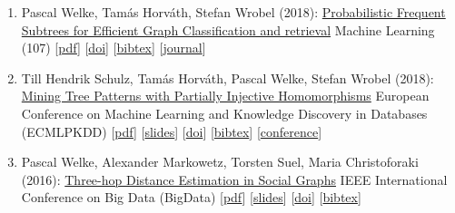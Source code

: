 \documentclass{scrartcl}
\begin{document}
\begin{enumerate}
Machine Learning (108)\newline
{\footnotesize
[\href{https://pwelke.de/publications/welke2019mach.pdf}{pdf}]
[\href{https://dx.doi.org/10.1007/s10994-019-05779-1}{doi}]
[\href{https://dblp.org/rec/journals/ml/WelkeHW19.bib}{bibtex}]
[\href{https://link.springer.com/journal/10994}{journal}]
}
\item
\label{welke2018mach}
Pascal Welke, Tamás Horváth, Stefan Wrobel (2018):\newline
\href{https://dx.doi.org/10.1007/s10994-017-5688-7}{Probabilistic Frequent Subtrees for Efficient Graph Classification
and retrieval}\newline
Machine Learning (107)\newline
{\footnotesize
[\href{https://pwelke.de/publications/welke2018mach.pdf}{pdf}]
[\href{https://dx.doi.org/10.1007/s10994-017-5688-7}{doi}]
[\href{https://dblp.org/rec/journals/ml/WelkeHW18.bib}{bibtex}]
[\href{https://link.springer.com/journal/10994}{journal}]
}
\item
\label{schulz2018ecml}
Till Hendrik Schulz, Tamás Horváth, Pascal Welke, Stefan Wrobel (2018):\newline
\href{https://dx.doi.org/10.1007/978-3-030-10928-8_35}{Mining Tree Patterns with Partially Injective Homomorphisms}\newline
European Conference on Machine Learning and Knowledge Discovery in Databases (ECMLPKDD)\newline
{\footnotesize
[\href{https://pwelke.de/publications/schulz2018ecml.pdf}{pdf}]
[\href{https://pwelke.de/publications/schulz2018ecml-slides.pdf}{slides}]
[\href{https://dx.doi.org/10.1007/978-3-030-10928-8_35}{doi}]
[\href{https://dblp.org/rec/conf/pkdd/SchulzHWW18.bib}{bibtex}]
[\href{http://www.ecmlpkdd2018.org/accepted-papers-by-track-2/#paperid-417}{conference}]
}
\item
\label{welke2016threehop}
Pascal Welke, Alexander Markowetz, Torsten Suel, Maria Christoforaki (2016):\newline
\href{https://dx.doi.org/10.1109/BigData.2016.7840706}{Three-hop Distance Estimation in Social Graphs}\newline
IEEE International Conference on Big Data (BigData)\newline
{\footnotesize
[\href{https://pwelke.de/publications/welke2016threehop.pdf}{pdf}]
[\href{https://pwelke.de/publications/welke2016threehop-slides.pdf}{slides}]
[\href{https://dx.doi.org/10.1109/BigData.2016.7840706}{doi}]
[\href{https://dblp.org/rec/conf/bigdataconf/WelkeMSC16.bib}{bibtex}]
}
\end{enumerate}
\end{document}
